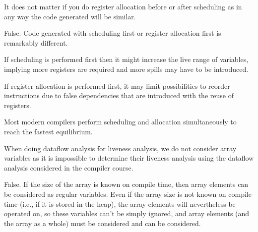 \documentclass[docid=2020]{comp_test2}
\begin{document}

\question
It does not matter if you do register allocation before or after scheduling as in any way the code generated will be similar.

\ansseparator

\noindent
False. Code generated with scheduling first or register allocation first is remarkably different.

If scheduling is performed first then it might increase the live range of variables, implying more registers are required and more spills may have to be introduced.

If register allocation is performed first, it may limit possibilities to reorder instructions due to false dependencies that are introduced with the reuse of registers.

Most modern compilers perform scheduling and allocation simultaneously to reach the fastest equilibrium.

\question
When doing dataflow analysis for liveness analysis, we do not consider array variables as it is impossible to determine their liveness analysis using the dataflow analysis considered in the compiler course. 

\ansseparator

\noindent
False. If the size of the array is known on compile time, then array elements can be considered as regular variables. Even if the array size is not known on compile time (i.e., if it is stored in the heap), the array elements will nevertheless be operated on, so these variables can't be simply ignored, and array elements (and the array as a whole) must be considered and can be considered.
\end{document}
